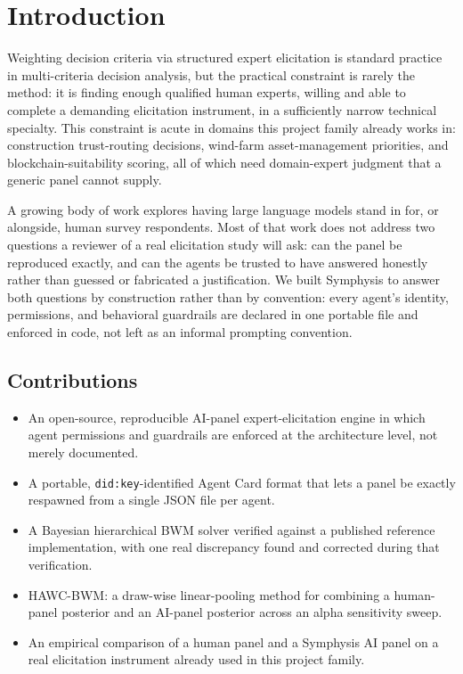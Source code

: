 \documentclass[11pt]{article}
\begin{document}
\section{Introduction}

Weighting decision criteria via structured expert elicitation is standard
practice in multi-criteria decision analysis, but the practical constraint
is rarely the method: it is finding enough qualified human experts,
willing and able to complete a demanding elicitation instrument, in a
sufficiently narrow technical specialty. This constraint is acute in
domains this project family already works in: construction trust-routing
decisions, wind-farm asset-management priorities, and blockchain-suitability
scoring, all of which need domain-expert judgment that a generic panel
cannot supply.

A growing body of work explores having large language models stand in for,
or alongside, human survey respondents. Most of that work does not address
two questions a reviewer of a real elicitation study will ask: can the
panel be reproduced exactly, and can the agents be trusted to have
answered honestly rather than guessed or fabricated a justification. We
built Symphysis to answer both questions by construction rather than by
convention: every agent's identity, permissions, and behavioral guardrails
are declared in one portable file and enforced in code, not left as an
informal prompting convention.

\subsection{Contributions}
\begin{itemize}
    \item An open-source, reproducible AI-panel expert-elicitation engine
    in which agent permissions and guardrails are enforced at the
    architecture level, not merely documented.
    \item A portable, \texttt{did:key}-identified Agent Card format that
    lets a panel be exactly respawned from a single JSON file per agent.
    \item A Bayesian hierarchical BWM solver verified against a published
    reference implementation, with one real discrepancy found and
    corrected during that verification.
    \item HAWC-BWM: a draw-wise linear-pooling method for combining a
    human-panel posterior and an AI-panel posterior across an alpha
    sensitivity sweep.
    \item An empirical comparison of a human panel and a Symphysis AI
    panel on a real elicitation instrument already used in this project
    family. %
\end{itemize}
\end{document}
